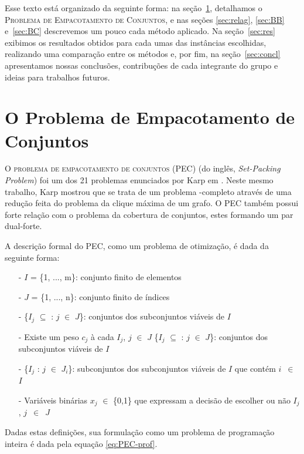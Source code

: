 \documentclass{article}
\begin{document}
	Esse texto está organizado da seguinte forma: na seção~\ref{sec:prob}, detalhamos o \textsc{Problema de Empacotamento de Conjuntos}, e nas seções \ref{sec:relag}, \ref{sec:BB} e~\ref{sec:BC} descrevemos um pouco cada método aplicado. Na seção~\ref{sec:res} exibimos os resultados obtidos para cada umas das instâncias escolhidas, realizando uma comparação entre os métodos e, por fim, na seção~\ref{sec:concl} apresentamos nossas conclusões, contribuções de cada integrante do grupo e ideias para trabalhos futuros.
	
	\section{O Problema de Empacotamento de Conjuntos}\label{sec:prob}
	O \textsc{problema de empacotamento de conjuntos} (PEC) (do inglês, \emph{Set-Packing Problem}) foi um dos 21 problemas enunciados por Karp em \cite{Karp}. Neste mesmo trabalho, Karp mostrou que se trata de um problema \NP-completo através de uma redução feita do problema da clique máxima de um grafo. O PEC também possui forte relação com o problema da cobertura de conjuntos, estes formando um par dual-forte.
	
	A descrição formal do PEC, como um problema de otimização, é dada da seguinte forma:

	\begin{itemize}
	    \item[-] $I$ = \{1, ..., m\}: conjunto finito de elementos
	    
	    \item[-] $J$ = \{1, ..., n\}: conjunto finito de índices
	    
	    \item[-] \{$I_j$ $\subseteq$ : $j$ $\in$ $J$\}: conjuntos dos subconjuntos viáveis de $I$
	    
	    \item[-] Existe um peso $c_j$ à cada $I_j$, $j$ $\in$ $J$
	    \{$I_j$ $\subseteq$ : $j$ $\in$ $J$\}: conjuntos dos subconjuntos viáveis de $I$
	    
	    \item[-] \{$I_j$ : $j$ $\in$ $J_i$\}: subconjuntos dos subconjuntos viáveis de $I$ que contém $i$~$\in$~$I$
	    \item[-] Variáveis binárias $x_j$ $\in$ \{0,1\} que expressam a decisão de escolher ou não $I_j$, $j$~$\in$~$J$
	\end{itemize}
	
	
	Dadas estas definições, sua formulação como um problema de programação inteira é dada pela equação \ref{eq:PEC-prof}.
	
\end{document}

